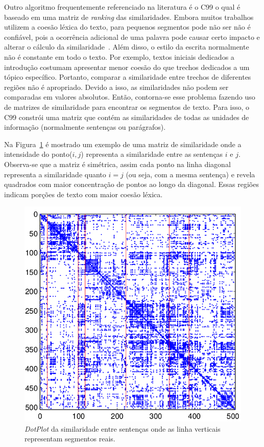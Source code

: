 
Outro algoritmo frequentemente referenciado na literatura é o C99 o qual é baseado em uma matriz de \textit{ranking} das similaridades. Embora muitos trabalhos utilizem a coesão léxica do texto, para pequenos segmentos pode não ser não é confiável, pois a ocorrência adicional de uma palavra pode causar certo impacto e alterar o cálculo da similaridade~\cite{Choi2000}. Além disso, o estilo da escrita normalmente não é constante em todo o texto. Por exemplo, textos iniciais dedicados a introdução costumam apresentar menor coesão do que trechos dedicados a um tópico específico. Portanto, comparar a similaridade entre trechos de diferentes regiões não é apropriado. Devido a isso, as similaridades não podem ser comparadas em valores absolutos. Então, contorna-se esse problema fazendo uso de matrizes de similaridade para encontrar os segmentos de texto. Para isso, o C99 constrói uma matriz que contém as similaridades de todas as unidades de informação (normalmente sentenças ou parágrafos). 


Na Figura~\ref{fig:matrix-similarity} é mostrado um exemplo de uma matriz de similaridade onde a intensidade do ponto($i,j$) representa a similaridade entre as sentenças $i$ e $j$. Observa-se que a matriz é simétrica, assim cada ponto na linha diagonal representa a similaridade quanto $i = j$ (ou seja, com a mesma sentença) e revela quadrados com maior concentração de pontos ao longo da diagonal. Essas regiões indicam porções de texto com maior coesão léxica.


  \begin{figure}[!h]
	  \centering
	  \includegraphics[width=1\textwidth]{conteudo/capitulos/figs/c99-ranking-matrix.png}
	  \caption{\textit{DotPlot} da similaridade entre sentenças onde as linha verticais representam segmentos reais.}
	  \label{fig:matrix-similarity}
  \end{figure}



